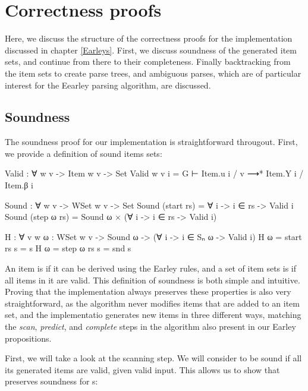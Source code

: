 
\chapter{Correctness proofs}
	
	Here, we discuss the structure of the correctness proofs for the 
	implementation discussed in chapter \ref{Earleys}. First, we discuss 
	soundness of the generated item sets, and continue from there to their 
	completeness. Finally backtracking from the item sets to create parse 
	trees, and ambiguous parses, which are of particular interest for the 
	Eearley parsing algorithm, are discussed.

	\section{Soundness}

		The soundness proof for our implementation is straightforward 
		througout. First, we provide a definition of sound items sets: 

		\begin{code}

			Valid : ∀ {w v} -> Item w v -> Set
			Valid {w} {v} i = G ⊢ Item.u i / v ⟶* Item.Y i / Item.β i

			Sound : ∀ {w v} -> WSet w v -> Set
			Sound (start rs) = ∀ {i} -> i ∈ rs -> Valid i
			Sound (step ω rs) = Sound ω × (∀ {i} -> i ∈ rs -> Valid i)

			H : ∀ {v w} {ω : WSet w v} -> Sound ω -> (∀ {i} -> i ∈ Sₙ ω -> Valid i)
			H {ω = start rs} s = s
			H {ω = step ω rs} s = snd s

		\end{code}
		
		An item is  if it can be derived using the Earley rules,
		and a set of item sets is  if all items in it are valid.
		This definition of soundness is both simple and intuitive. Proving that
		the implementation always preserves these properties is also very
		straightforward, as the algorithm never modifies items that are added
		to an item set, and the implementatio generates new items in three
		different ways, matching the \emph{scan}, \emph{predict}, and
		\emph{complete} steps in the algorithm also present in our Earley
		propositions.

		First, we will take a look at the scanning step. We will consider 
		 to be sound if all its generated items are valid, given
		valid input. This allows us to show that  preserves 
		soundness for s:

